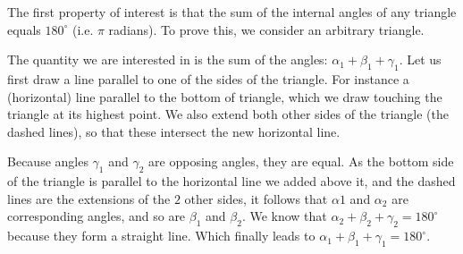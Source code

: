 \noindent The first property of interest is that the sum of the internal angles of any triangle equals $180^{\circ}$ (i.e. $\pi$ radians). To prove this, we consider an arbitrary triangle.
\begin{center}
\end{center}
\noindent The quantity we are interested in is the sum of the angles: $\alpha_1+\beta_1+\gamma_1$. Let us first draw a line parallel to one of the sides of the triangle. For instance a (horizontal) line parallel to the bottom of triangle, which we draw touching the triangle at its highest point. We also extend both other sides of the triangle (the dashed lines), so that these intersect the new horizontal line.
\begin{center}
\end{center}
\noindent Because angles $\gamma_1$ and $\gamma_2$ are opposing angles, they are equal. As the bottom side of the triangle is parallel to the horizontal line we added above it, and the dashed lines are the extensions of the $2$ other sides, it follows that $\alpha1$ and $\alpha_2$ are corresponding angles, and so are $\beta_1$ and $\beta_2$. We know that $\alpha_2 + \beta_2 + \gamma_2 = 180^{\circ}$ because they form a straight line. Which finally leads to $\alpha_1 + \beta_1 + \gamma_1 = 180^{\circ}$.\\

